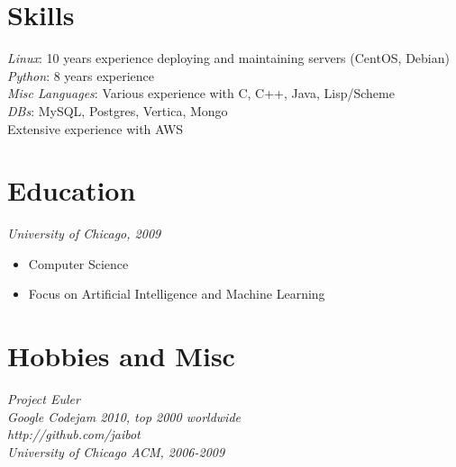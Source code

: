 \documentclass[11pt]{res} %
\begin{document}
\begin{resume}
\section{Skills}
{\sl Linux}: 10 years experience deploying and maintaining servers (CentOS, Debian)\\
{\sl Python}: 8 years experience \\
{\sl Misc Languages}: Various experience with C, C++, Java, Lisp/Scheme \\
{\sl DBs}: MySQL, Postgres, Vertica, Mongo \\
Extensive experience with AWS


\section{Education}

{\sl University of Chicago, 2009}
\begin{itemize}
    \item Computer Science
    \item Focus on Artificial Intelligence and Machine Learning
\end{itemize}
 

\section{Hobbies and Misc} 

{\it Project Euler} \\
{\it Google Codejam 2010, top 2000 worldwide} \\
{\it http://github.com/jaibot } \\
{\it University of Chicago ACM, 2006-2009} \\



\end{resume}
\end{document}
